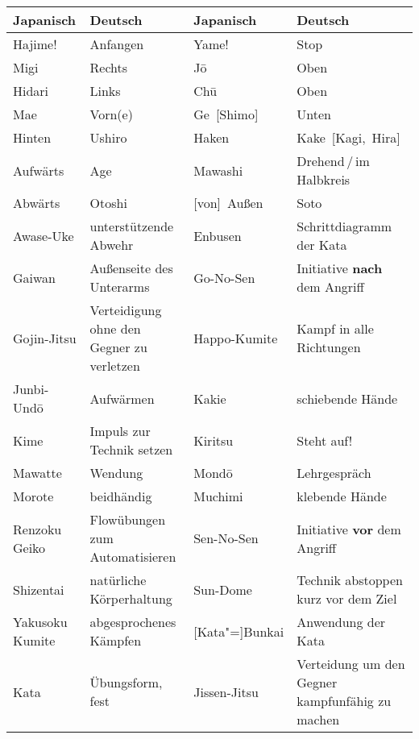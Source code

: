 	{\footnotesize \begin{tabularx}{\linewidth}{lXlX}
	Japanisch	& Deutsch	& Japanisch&Deutsch\\
	\midrule
	Hajime!			&	Anfangen										&	Yame!			&	Stop\\
	Migi			&	Rechts 											& J\={o} 			&	Oben\\
	Hidari 			&	Links 											& Ch\={u}			&	Oben\\
	Mae 			&	Vorn(e)											& Ge~[Shimo] 		&	Unten\\
	Hinten 			&	Ushiro							 				& Haken			& 	Kake~[Kagi,~Hira]\\
	Aufwärts		&	Age							 					& Mawashi			&	Drehend\,/\,im Halbkreis\\
	Abwärts 		&	Otoshi							 				&	[von]~Außen		&	Soto \\
	\addlinespace
	Awase-Uke		&	unterstützende Abwehr							&
	Enbusen			&	Schrittdiagramm der Kata\\
	Gaiwan			& 	Außenseite des Unterarms						&
	Go-No-Sen		&	Initiative \textbf{nach} dem Angriff\\
	Gojin-Jitsu		&	Verteidigung ohne den Gegner zu verletzen		&
	Happo-Kumite	& 	Kampf in alle Richtungen\\
	Junbi-Und\={o}	& 	Aufwärmen										&
	Kakie			& 	schiebende Hände\\
	Kime			&	Impuls zur Technik setzen						&
	Kiritsu 		&	Steht auf!\\
	Mawatte			&	Wendung											&
	Mond\={o}		& 	Lehrgespräch\\
	Morote			&	beidhändig										&
	Muchimi 		&	klebende Hände\\
	Renzoku Geiko	&	Flowübungen zum Automatisieren 					&
	Sen-No-Sen 		&	Initiative \textbf{vor} dem Angriff\\
	Shizentai		&	natürliche Körperhaltung						&
	Sun-Dome 		&	Technik abstoppen  kurz vor dem Ziel\\
	Yakusoku Kumite &	abgesprochenes Kämpfen 							&
	[Kata"=]Bunkai 	&	Anwendung der Kata \\
	Kata			&	Übungsform, fest 								&
	Jissen-Jitsu	&	Verteidung um den Gegner kampfunfähig zu machen\\
	\end{tabularx}}